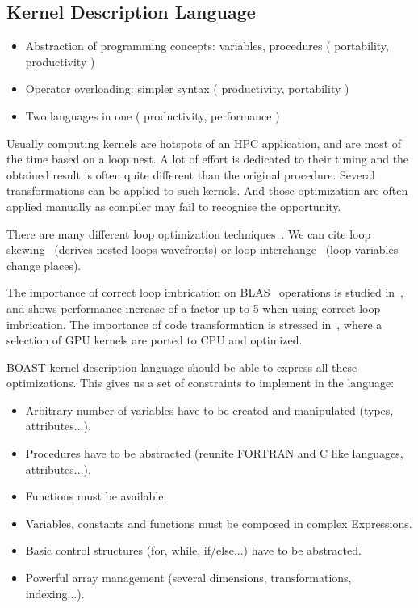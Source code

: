 \documentclass[11pt, a4paper, twoside]{montblanc}
\begin{document}
  \cite{videau2013boast}

  \subsection{Kernel Description Language}

  \begin{itemize}
  \item Abstraction of programming concepts: variables, procedures (
portability, productivity )
  \item Operator overloading: simpler syntax ( productivity, portability )
  \item Two languages in one ( productivity, performance ) 
  \end{itemize}

Usually computing kernels are hotspots of an HPC application, and are most of
the time based on a loop nest. A lot of effort is dedicated to their tuning and
the obtained result is often quite different than the original procedure.
Several transformations can be applied to such kernels. And those optimization
are often applied manually as compiler may fail to recognise the opportunity.

There are many different loop optimization techniques~\cite{wolf1991loop}. We
can cite loop skewing~\cite{wolfe1986loops} (derives nested loops wavefronts)
or loop interchange~\cite{allen1984automatic} (loop variables change places).

The importance of  correct loop imbrication on BLAS~\cite{lawson1979basic}
operations is studied in~\cite{soliman2009performance}, and shows performance
increase of a factor up to 5 when using correct loop imbrication. The importance
of code transformation is stressed in~\cite{ye2011porting}, where a selection of GPU
kernels are ported to CPU and optimized.

BOAST kernel description language should be able to express all these
optimizations. This gives us a set of constraints to implement in the language:
\begin{itemize}
\item Arbitrary number of variables have to be created and manipulated (types,
attributes...).
\item Procedures have to be abstracted (reunite FORTRAN and C like languages,
attributes...).
\item Functions must be available.
\item Variables, constants and functions must be composed in complex
Expressions.
\item Basic control structures (for, while, if/else...) have to be abstracted.
\item Powerful array management (several dimensions, transformations,
indexing...).
\end{itemize}
\end{document}
